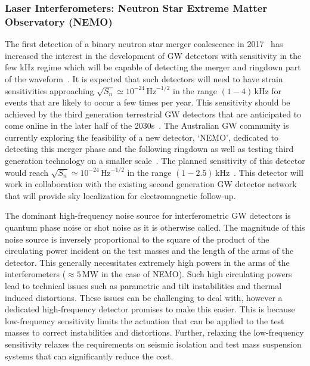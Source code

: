 \documentclass[11pt,a4paper]{article}
\begin{document}
\subsubsection{Laser Interferometers: Neutron Star Extreme Matter Observatory (NEMO)} \label{sec:ozgrav}

The first detection of a binary neutron star merger coalescence in 2017~\cite{abbott2017gw170817} has increased the interest in the development of GW detectors with sensitivity in the few kHz regime which will be capable of detecting the merger and ringdown part of the waveform~\cite{martynov2019exploring}. It is expected that such detectors will need to have strain sensitivities approaching $\sqrt{S_n} \simeq 10^{-24}\, \text{Hz}^{-1/2}$ in the range $(1-4)\,$kHz for events that are likely to occur a few times per year. This sensitivity should be achieved by the third generation terrestrial GW detectors that are anticipated to come online in the later half of the 2030s~\cite{Evans:2016mbw,Punturo:2010zz}. The Australian GW community is currently exploring the feasibility of a new detector, `NEMO', dedicated to detecting this merger phase and the following ringdown as well as testing third generation technology on a smaller scale~\cite{ozhf, Bailes:2019oma,Adya2020}. The planned sensitivity of this detector would reach $\sqrt{S_n} \simeq 10^{-24}\, \text{Hz}^{-1/2}$ in the range $(1 - 2.5)\,$kHz~\cite{ozhf}. This detector will work in collaboration with the existing second generation GW detector network that will provide sky localization for electromagnetic follow-up.

The dominant high-frequency noise source for interferometric GW detectors is quantum phase noise or shot noise as it is otherwise called. The magnitude of this noise source is inversely proportional to the square of the product of the circulating power incident on the test masses and the length of the arms of the detector. This generally necessitates extremely high powers in the arms of the interferometers ($\approx 5 \,\text{MW}$ in the case of NEMO). Such high circulating powers lead to technical issues such as parametric and tilt instabilities and thermal induced distortions. These issues can be challenging to deal with, however a dedicated high-frequency detector promises to make this easier. This is because low-frequency sensitivity limits the actuation that can be applied to the test masses to correct instabilities and distortions. Further, relaxing the low-frequency sensitivity relaxes the requirements on seismic isolation and test mass suspension systems that can significantly reduce the cost.
\end{document}
